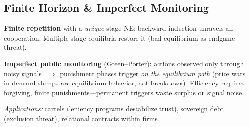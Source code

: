 \subsection{Finite Horizon \& Imperfect Monitoring}
\textbf{Finite repetition} with a \textit{unique} stage NE: backward induction unravels all cooperation. Multiple stage equilibria restore it (bad equilibrium as endgame threat).

\textbf{Imperfect public monitoring} (Green--Porter): actions observed only through noisy signals \(\implies\) punishment phases trigger \textit{on the equilibrium path} (price wars in demand slumps are equilibrium behavior, not breakdown). Efficiency requires forgiving, finite punishments---permanent triggers waste surplus on signal noise.

\textit{Applications:} cartels (leniency programs destabilize trust), sovereign debt (exclusion threat), relational contracts within firms.
